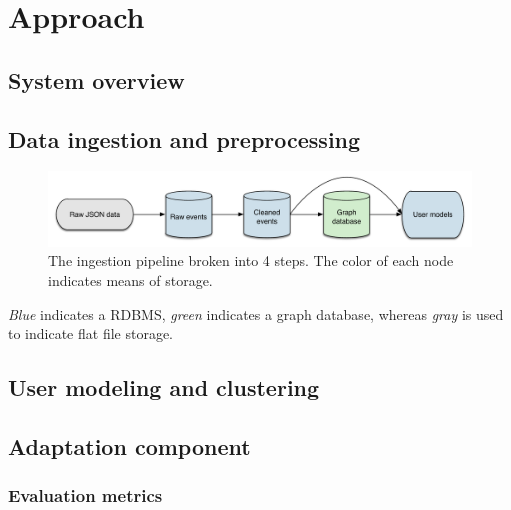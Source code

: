 \chapter{Approach}

\label{Chapter3}


\section{System overview} %
\label{sec:system_overview}


\section{Data ingestion and preprocessing} %
\label{sec:data_ingestion_and_preprocessing}

\begin{figure}[h]
  \centering
    \includegraphics[width=\textwidth]{Figures/ingestion-pipeline}
  \caption{The ingestion pipeline broken into 4 steps. The color of each node indicates means of storage.}
  \label{fig:ingestion-pipeline}
\end{figure}

\emph{Blue} indicates a RDBMS, \emph{green} indicates a graph database, whereas \emph{gray} is used to indicate flat file storage.


\section{User modeling and clustering} %
\label{sec:user_modeling_and_clustering}


\section{Adaptation component} %
\label{sec:adaptation_component}

\subsection{Evaluation metrics} %
\label{sub:evaluation_metrics}

